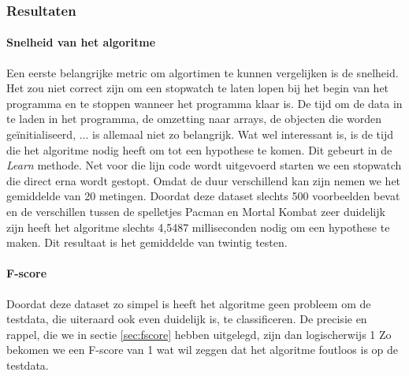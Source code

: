 \subsubsection{Resultaten}
\paragraph{Snelheid van het algoritme} 
Een eerste belangrijke metric om algortimen te kunnen vergelijken is de snelheid. Het zou niet correct zijn om een stopwatch te laten lopen bij het begin van het programma en te stoppen wanneer het programma klaar is. De tijd om de data in te laden in het programma, de omzetting naar arrays, de objecten die worden geïnitialiseerd, ... is allemaal niet zo belangrijk. Wat wel interessant is, is de tijd die het algoritme nodig heeft om tot een hypothese te komen. Dit gebeurt in de \textit{Learn} methode. 
Net voor die lijn code wordt uitgevoerd starten we een stopwatch die direct erna wordt gestopt. Omdat de duur verschillend kan zijn nemen we het gemiddelde van 20 metingen. 
Doordat deze dataset slechts 500 voorbeelden bevat en de verschillen tussen de spelletjes Pacman en Mortal Kombat zeer duidelijk zijn heeft het algoritme slechts 4,5487 milliseconden nodig om een hypothese te maken. Dit resultaat is het gemiddelde van twintig testen. 
\paragraph{F-score} 

Doordat deze dataset zo simpel is  heeft het algoritme geen probleem om de testdata, die uiteraard ook even duidelijk is, te classificeren. De precisie en rappel, die we in sectie \ref{sec:fscore} hebben uitgelegd, zijn dan logischerwijs 1
Zo bekomen we een F-score van 1 wat wil zeggen dat het algoritme foutloos is op de testdata.  



